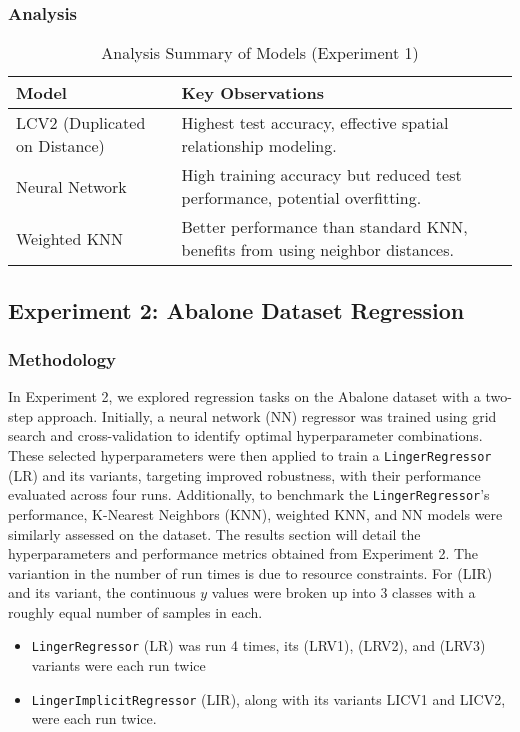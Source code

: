 \documentclass[a4paper, 12pt]{report}
\begin{document}
\subsubsection{Analysis}
\begin{table}[H]
    \centering
    \caption{Analysis Summary of Models (Experiment 1)}
    \label{tab:analysis_summary}
    \begin{tabular}{|l|l|}
    \hline
    \textbf{Model} & \textbf{Key Observations} \\
    \hline
    LCV2 (Duplicated on Distance) & Highest test accuracy, effective spatial relationship modeling. \\
    \hline
    Neural Network & High training accuracy but reduced test performance, potential overfitting. \\
    \hline
    Weighted KNN & Better performance than standard KNN, benefits from using neighbor distances. \\
    \hline
    \end{tabular}
\end{table}

\subsection{Experiment 2: Abalone Dataset Regression}
\subsubsection{Methodology}
\label{exp:2Abalone}
In Experiment 2, we explored regression tasks on the Abalone dataset with a two-step approach. 
Initially, a neural network (NN) regressor was trained using grid search and cross-validation to identify optimal hyperparameter combinations. 
These selected hyperparameters were then applied to train a \texttt{LingerRegressor} (LR) and its variants, targeting improved robustness, 
with their performance evaluated across four runs. Additionally, to benchmark the \texttt{LingerRegressor}'s performance, K-Nearest Neighbors (KNN), 
weighted KNN, and NN models were similarly assessed on the dataset. The results section will detail the hyperparameters and performance metrics obtained from Experiment 2.
The variantion in the number of run times is due to resource constraints. 
For (LIR) and its variant, the continuous $y$ values were broken up into 3 classes with a roughly equal number of samples in each.
\begin{itemize}
    \item \texttt{LingerRegressor} (LR) was run 4 times, its (LRV1), (LRV2), and (LRV3) variants were each run twice
    \item \texttt{LingerImplicitRegressor} (LIR), along with its variants LICV1 and LICV2, were each run twice.
\end{itemize}
\end{document}
